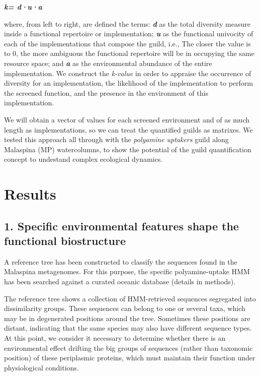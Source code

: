\documentclass[Journal,letterpaper,NoLists]{ascelike-new}
\begin{document}
\textbf{\textit{k= d·u·a }}

where, from left to right, are defined the terms: \textbf{\textit{d}} as the total diversity measure inside a functional repertoire or implementation; \textbf{\textit{u}} as the functional univocity of each of the implementations that compose the guild, i.e., The closer the value is to 0, the more ambiguous the functional repertoire will be in occupying the same resource space; and \textbf{\textit{a}} as the environmental abundance of the entire implementation. We construct the \textit{k-value} in order to appraise the occurrence of diversity for an implementation, the likelihood of the implementation to perform the screened function, and the presence in the environment of this implementation.

We will obtain a vector of values for each screened environment and of as much length as implementations, so we can treat the quantified guilds as matrixes. We tested this approach all through with the \textit{polyamine uptakers} guild along Malaspina (MP) watercolumns, to show the potential of the guild quantification concept to undestand complex ecological dynamics. 




\section{Results}




\subsection{1. Specific environmental features shape the functional biostructure}

A reference tree has been constructed to classify the sequences found in the Malaspina metagenomes. For this purpose, the specific polyamine-uptake HMM has been searched against a curated oceanic database (details in methods). 

The reference tree shows a collection of HMM-retrieved sequences segregated into dissimilarity groups. These sequences can belong to one or several taxa, which may be in degenerated positions around the tree. Sometimes these positions are distant, indicating that the same species may also have different sequence types. At this point, we consider it necessary to determine whether there is an environmental effect drifting the big groups of sequences (rather than taxonomic position) of these periplasmic proteins, which must maintain their function under physiological conditions.
\end{document}
